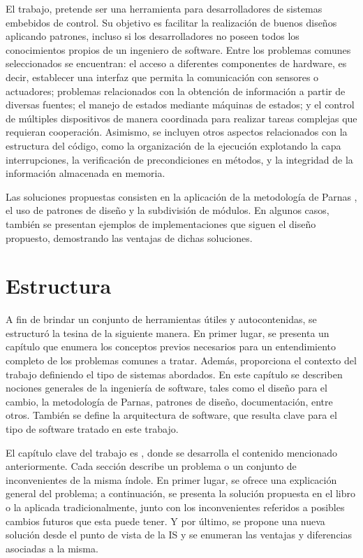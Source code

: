 El trabajo, pretende ser una herramienta para desarrolladores de sistemas embebidos de control. Su objetivo es facilitar la realización de buenos diseños aplicando patrones, incluso si los desarrolladores no poseen todos los conocimientos propios de un ingeniero de software. Entre los problemas comunes seleccionados se encuentran: el acceso a diferentes componentes de hardware, es decir, establecer una interfaz que permita la comunicación con sensores o actuadores; problemas relacionados con la obtención de información a partir de diversas fuentes; el manejo de estados mediante máquinas de estados; y el control de múltiples dispositivos de manera coordinada para realizar tareas complejas que requieran cooperación. Asimismo, se incluyen otros aspectos relacionados con la estructura del código, como la organización de la ejecución explotando la capa interrupciones, la verificación de precondiciones en métodos, y la integridad de la información almacenada en memoria.

Las soluciones propuestas consisten en la aplicación de la metodología de Parnas \cite{parnas72}, el uso de patrones de diseño y la subdivisión de módulos. En algunos casos, también se presentan ejemplos de implementaciones que siguen el diseño propuesto, demostrando las ventajas de dichas soluciones.

\section*{Estructura}

A fin de brindar un conjunto de herramientas útiles y autocontenidas, se estructuró la tesina de la siguiente manera. En primer lugar, se presenta un capítulo que enumera los conceptos previos necesarios para un entendimiento completo de los problemas comunes a tratar. Además, proporciona el contexto del trabajo definiendo el tipo de sistemas abordados. En este capítulo se describen nociones generales de la ingeniería de software, tales como el diseño para el cambio, la metodología de Parnas, patrones de diseño, documentación, entre otros. También se define la arquitectura de software, que resulta clave para el tipo de software tratado en este trabajo.

El capítulo clave del trabajo es , donde se desarrolla el contenido mencionado anteriormente. Cada sección describe un problema o un conjunto de inconvenientes de la misma índole. En primer lugar, se ofrece una explicación general del problema; a continuación, se presenta la solución propuesta en el libro o la aplicada tradicionalmente, junto con los inconvenientes referidos a posibles cambios futuros que esta puede tener. Y por último, se propone una nueva solución desde el punto de vista de la IS y se enumeran las ventajas y diferencias asociadas a la misma.



